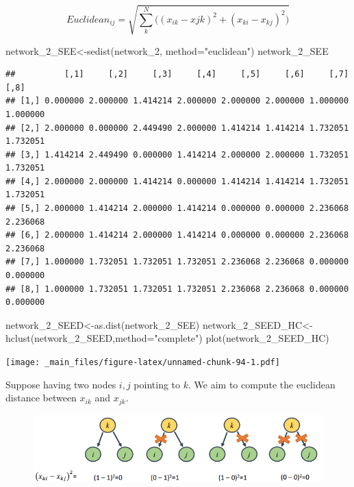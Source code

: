 \documentclass[
  notitlepage,
  onecolumn,
  openany]{book}
\newenvironment{Shaded}{\begin{snugshade}}{\end{snugshade}}
\newcommand{\AttributeTok}[1]{\textcolor[rgb]{0.77,0.63,0.00}{#1}}
\newcommand{\FunctionTok}[1]{\textcolor[rgb]{0.00,0.00,0.00}{#1}}
\newcommand{\NormalTok}[1]{#1}
\newcommand{\OtherTok}[1]{\textcolor[rgb]{0.56,0.35,0.01}{#1}}
\newcommand{\StringTok}[1]{\textcolor[rgb]{0.31,0.60,0.02}{#1}}
\begin{document}
\[
Euclidean_{ij} = \sqrt{\sum_k^N \Big((x_{ik}-x{jk})^2+(x_{ki}-x_{kj})^2\Big)}
\]

\begin{Shaded}
\begin{Highlighting}[]
\NormalTok{network\_2\_SEE}\OtherTok{\textless{}{-}}\FunctionTok{sedist}\NormalTok{(network\_2, }\AttributeTok{method=}\StringTok{"euclidean"}\NormalTok{)}
\NormalTok{network\_2\_SEE}
\end{Highlighting}
\end{Shaded}

\begin{verbatim}
##          [,1]     [,2]     [,3]     [,4]     [,5]     [,6]     [,7]     [,8]
## [1,] 0.000000 2.000000 1.414214 2.000000 2.000000 2.000000 1.000000 1.000000
## [2,] 2.000000 0.000000 2.449490 2.000000 1.414214 1.414214 1.732051 1.732051
## [3,] 1.414214 2.449490 0.000000 1.414214 2.000000 2.000000 1.732051 1.732051
## [4,] 2.000000 2.000000 1.414214 0.000000 1.414214 1.414214 1.732051 1.732051
## [5,] 2.000000 1.414214 2.000000 1.414214 0.000000 0.000000 2.236068 2.236068
## [6,] 2.000000 1.414214 2.000000 1.414214 0.000000 0.000000 2.236068 2.236068
## [7,] 1.000000 1.732051 1.732051 1.732051 2.236068 2.236068 0.000000 0.000000
## [8,] 1.000000 1.732051 1.732051 1.732051 2.236068 2.236068 0.000000 0.000000
\end{verbatim}

\begin{Shaded}
\begin{Highlighting}[]
\NormalTok{network\_2\_SEED}\OtherTok{\textless{}{-}}\FunctionTok{as.dist}\NormalTok{(network\_2\_SEE)}
\NormalTok{network\_2\_SEED\_HC}\OtherTok{\textless{}{-}}\FunctionTok{hclust}\NormalTok{(network\_2\_SEED,}\AttributeTok{method=}\StringTok{"complete"}\NormalTok{)}
\FunctionTok{plot}\NormalTok{(network\_2\_SEED\_HC)}
\end{Highlighting}
\end{Shaded}

\texttt{[image: \_main\_files/figure-latex/unnamed-chunk-94-1.pdf]}

Suppose having two nodes \(i,j\) pointing to \(k\). We aim to compute the euclidean distance between \(x_{ik}\) and \(x_{jk}\).

\begin{figure}[h!]

{\centering \includegraphics[width=0.8\linewidth]{images/11-Subgroups and Structural Equivalence/Untitled 9} 

}

\end{figure}
\end{document}
